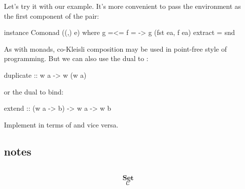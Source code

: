\documentclass[DaoFP]{subfiles}
\begin{document}
Let's try it with our example. It's more convenient to pass the environment as the first component of the pair:
\begin{haskell}
instance Comonad ((,) e) where
  g =<= f = \ea -> g (fst ea, f ea)
  extract = snd
\end{haskell}

As with monads, co-Kleisli composition may be used in point-free style of programming. But we can also use the dual to :
\begin{haskell}
  duplicate :: w a -> w (w a)
\end{haskell}
or the dual to bind:
\begin{haskell}
  extend :: (w a -> b) -> w a -> w b
\end{haskell}

\begin{exercise}
Implement  in terms of  and vice versa.
\end{exercise}


\subsection{notes}


\begin{exercise}
\end{exercise}

\begin{haskell}
\end{haskell}

\[
 \begin{tikzcd}
  \end{tikzcd}
\]

\[   \mathbf{Set} \]
\[   \mathcal{C} \]
\end{document}
